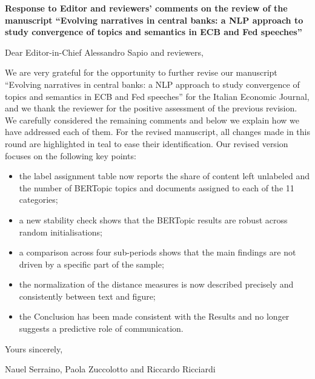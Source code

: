 \documentclass{report}
\theoremstyle{plain}
\begin{document}
\begin{center}{\bf Response to Editor and reviewers' comments on the review of the manuscript ``Evolving narratives in central banks: a NLP approach to study convergence of topics and semantics in ECB and Fed speeches'' }

\end{center}
\vspace*{0.5cm}
Dear Editor-in-Chief Alessandro Sapio and reviewers,

\vspace*{0.3cm}
We are very grateful for the opportunity to further revise our manuscript ``Evolving narratives in central banks: a NLP approach to study convergence of topics and semantics in ECB and Fed speeches'' for the Italian Economic Journal, and we thank the reviewer for the positive assessment of the previous revision. We carefully considered the remaining comments and below we explain how we have addressed each of them. For the revised manuscript, all changes made in this round are highlighted in teal to ease their identification. Our revised version focuses on the following key points:
\begin{itemize}
\item the label assignment table now reports the share of content left unlabeled and the number of BERTopic topics and documents assigned to each of the 11 categories;
\item a new stability check shows that the BERTopic results are robust across random initialisations;
\item a comparison across four sub-periods shows that the main findings are not driven by a specific part of the sample;
\item the normalization of the distance measures is now described precisely and consistently between text and figure;
\item the Conclusion has been made consistent with the Results and no longer suggests a predictive role of communication.
\end{itemize}



\vspace*{0.3cm}
\begin{flushright}
Yours sincerely,\\\medskip

Nauel Serraino, Paola Zuccolotto and Riccardo Ricciardi
\end{flushright}
\end{document}
